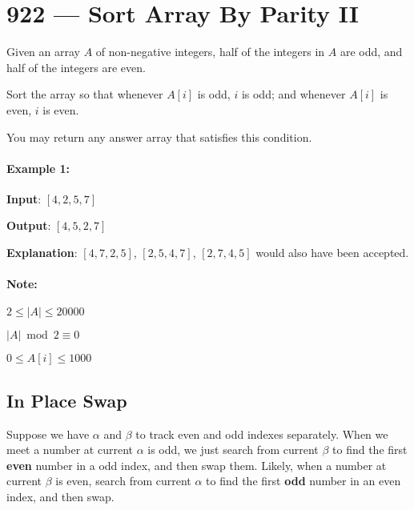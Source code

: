 \section{922 --- Sort Array By Parity II}
Given an array $A$ of non-negative integers, half of the integers in $A$ are odd, and half of the integers are even.
\par
Sort the array so that whenever $A[i]$ is odd, $i$ is odd; and whenever $A[i]$ is even, $i$ is even.
\par
You may return any answer array that satisfies this condition.
\paragraph{Example 1:}
 \begin{flushleft}
\textbf{Input}: $[4,2,5,7]$
\par
\textbf{Output}: $[4,5,2,7]$
\par
\textbf{Explanation}: $[4,7,2,5]$, $[2,5,4,7]$, $[2,7,4,5]$ would also have been accepted. 
 \end{flushleft}
\paragraph{Note:}
\begin{flushleft}
$2 \leq |A| \leq 20000$
\par
$|A| \bmod 2 \equiv 0$
\par
$0\leq A[i] \leq 1000$
\end{flushleft}
\subsection{In Place Swap}
Suppose we have $\alpha$ and $\beta$ to track even and odd indexes separately. When we meet a number at current $\alpha$ is odd, we just search from current $\beta$ to find the first \textbf{even} number in a {\color{red}odd} index, and then swap them. Likely, when a number at current $\beta$ is even, search from current $\alpha$ to find the first \textbf{odd} number in an {\color{red}even} index, and then swap. 
